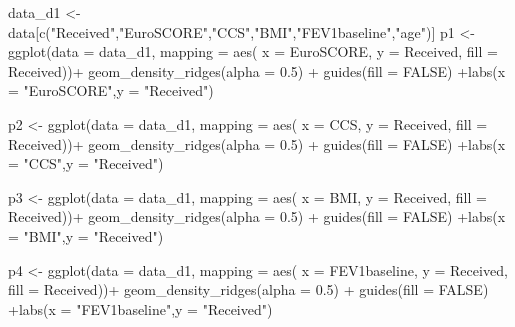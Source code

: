 \documentclass[
]{article}
\newenvironment{Shaded}{\begin{snugshade}}{\end{snugshade}}
\newcommand{\AttributeTok}[1]{\textcolor[rgb]{0.77,0.63,0.00}{#1}}
\newcommand{\ConstantTok}[1]{\textcolor[rgb]{0.00,0.00,0.00}{#1}}
\newcommand{\FloatTok}[1]{\textcolor[rgb]{0.00,0.00,0.81}{#1}}
\newcommand{\FunctionTok}[1]{\textcolor[rgb]{0.00,0.00,0.00}{#1}}
\newcommand{\NormalTok}[1]{#1}
\newcommand{\OtherTok}[1]{\textcolor[rgb]{0.56,0.35,0.01}{#1}}
\newcommand{\SpecialCharTok}[1]{\textcolor[rgb]{0.00,0.00,0.00}{#1}}
\newcommand{\StringTok}[1]{\textcolor[rgb]{0.31,0.60,0.02}{#1}}
\begin{document}
\begin{Shaded}
\begin{Highlighting}[]
\NormalTok{data\_d1 }\OtherTok{\textless{}{-}}\NormalTok{ data[}\FunctionTok{c}\NormalTok{(}\StringTok{"Received"}\NormalTok{,}\StringTok{"EuroSCORE"}\NormalTok{,}\StringTok{"CCS"}\NormalTok{,}\StringTok{"BMI"}\NormalTok{,}\StringTok{"FEV1baseline"}\NormalTok{,}\StringTok{"age"}\NormalTok{)]}
\NormalTok{p1 }\OtherTok{\textless{}{-}} \FunctionTok{ggplot}\NormalTok{(}\AttributeTok{data =}\NormalTok{ data\_d1, }\AttributeTok{mapping =} \FunctionTok{aes}\NormalTok{(}
   \AttributeTok{x =}\NormalTok{ EuroSCORE, }
   \AttributeTok{y =}\NormalTok{ Received,}
   \AttributeTok{fill =}\NormalTok{ Received))}\SpecialCharTok{+} \FunctionTok{geom\_density\_ridges}\NormalTok{(}\AttributeTok{alpha =} \FloatTok{0.5}\NormalTok{) }\SpecialCharTok{+} \FunctionTok{guides}\NormalTok{(}\AttributeTok{fill =} \ConstantTok{FALSE}\NormalTok{) }\SpecialCharTok{+}\FunctionTok{labs}\NormalTok{(}\AttributeTok{x =} \StringTok{"EuroSCORE"}\NormalTok{,}\AttributeTok{y =} \StringTok{"Received"}\NormalTok{)}

\NormalTok{p2 }\OtherTok{\textless{}{-}} \FunctionTok{ggplot}\NormalTok{(}\AttributeTok{data =}\NormalTok{ data\_d1, }\AttributeTok{mapping =} \FunctionTok{aes}\NormalTok{(}
   \AttributeTok{x =}\NormalTok{ CCS, }
   \AttributeTok{y =}\NormalTok{ Received,}
   \AttributeTok{fill =}\NormalTok{ Received))}\SpecialCharTok{+} \FunctionTok{geom\_density\_ridges}\NormalTok{(}\AttributeTok{alpha =} \FloatTok{0.5}\NormalTok{) }\SpecialCharTok{+} \FunctionTok{guides}\NormalTok{(}\AttributeTok{fill =} \ConstantTok{FALSE}\NormalTok{) }\SpecialCharTok{+}\FunctionTok{labs}\NormalTok{(}\AttributeTok{x =} \StringTok{"CCS"}\NormalTok{,}\AttributeTok{y =} \StringTok{"Received"}\NormalTok{)}

\NormalTok{p3 }\OtherTok{\textless{}{-}} \FunctionTok{ggplot}\NormalTok{(}\AttributeTok{data =}\NormalTok{ data\_d1, }\AttributeTok{mapping =} \FunctionTok{aes}\NormalTok{(}
   \AttributeTok{x =}\NormalTok{ BMI, }
   \AttributeTok{y =}\NormalTok{ Received,}
   \AttributeTok{fill =}\NormalTok{ Received))}\SpecialCharTok{+} \FunctionTok{geom\_density\_ridges}\NormalTok{(}\AttributeTok{alpha =} \FloatTok{0.5}\NormalTok{) }\SpecialCharTok{+} \FunctionTok{guides}\NormalTok{(}\AttributeTok{fill =} \ConstantTok{FALSE}\NormalTok{) }\SpecialCharTok{+}\FunctionTok{labs}\NormalTok{(}\AttributeTok{x =} \StringTok{"BMI"}\NormalTok{,}\AttributeTok{y =} \StringTok{"Received"}\NormalTok{)}

\NormalTok{p4 }\OtherTok{\textless{}{-}} \FunctionTok{ggplot}\NormalTok{(}\AttributeTok{data =}\NormalTok{ data\_d1, }\AttributeTok{mapping =} \FunctionTok{aes}\NormalTok{(}
   \AttributeTok{x =}\NormalTok{ FEV1baseline, }
   \AttributeTok{y =}\NormalTok{ Received,}
   \AttributeTok{fill =}\NormalTok{ Received))}\SpecialCharTok{+} \FunctionTok{geom\_density\_ridges}\NormalTok{(}\AttributeTok{alpha =} \FloatTok{0.5}\NormalTok{) }\SpecialCharTok{+} \FunctionTok{guides}\NormalTok{(}\AttributeTok{fill =} \ConstantTok{FALSE}\NormalTok{) }\SpecialCharTok{+}\FunctionTok{labs}\NormalTok{(}\AttributeTok{x =} \StringTok{"FEV1baseline"}\NormalTok{,}\AttributeTok{y =} \StringTok{"Received"}\NormalTok{)}


\end{Highlighting}
\end{Shaded}
\end{document}
